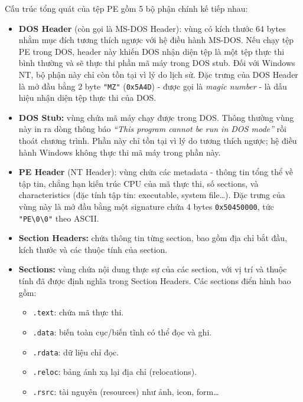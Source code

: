 Cấu trúc tổng quát của tệp PE gồm 5 bộ phận chính kế tiếp nhau:

\begin{itemize}
    \item \textbf{DOS Header} (còn gọi là MS-DOS Header): vùng có kích
        thước 64 bytes nhằm mục đích tương thích ngược với hệ điều hành
        MS-DOS. Nếu chạy tệp PE trong DOS, header này khiến DOS nhận
        diện tệp là một tệp thực thi bình thường và sẽ thực thi phần mã
        máy trong DOS stub. Đối với Windows NT, bộ phận này chỉ còn tồn
        tại vì lý do lịch sử. Đặc trưng của DOS Header là mở đầu bằng
        2 byte \texttt{"MZ"} (\texttt{0x5A4D}) - được gọi là
        \textit{magic number} - là dấu hiệu nhận diện tệp thực thi
        của DOS.

    \item \textbf{DOS Stub:} vùng chứa mã máy chạy được trong DOS.
        Thông thường vùng này in ra dòng thông báo \textit{``This
        program cannot be run in DOS mode''} rồi thoát chương trình.
        Phần này chỉ tồn tại vì lý do tương thích ngược; hệ điều hành
        Windows không thực thi mã máy trong phần này.

    \item \textbf{PE Header} (NT Header): vùng chứa các metadata -
        thông tin tổng thể về tập tin, chẳng hạn kiến trúc CPU của mã
        thực thi, số sections, và characteristics (đặc tính tập tin:
        executable, system file\dots). Đặc trưng của vùng này là mở đầu
        bằng một signature chứa 4 bytes \texttt{0x50450000}, tức
        \texttt{"PE{\textbackslash}0{\textbackslash}0"} theo ASCII.

    \item \textbf{Section Headers:} chứa thông tin từng section, bao
        gồm địa chỉ bắt đầu, kích thước và các thuộc tính của section.

    \item \textbf{Sections:} vùng chứa nội dung thực sự của các
        section, với vị trí và thuộc tính đã được định nghĩa trong
        Section Headers. Các sections điển hình bao gồm:
        \begin{itemize}
            \item \texttt{.text}: chứa mã thực thi.
            \item \texttt{.data}: biến toàn cục/biến tĩnh có thể đọc
                và ghi.
            \item \texttt{.rdata}: dữ liệu chỉ đọc.
            \item \texttt{.reloc}: bảng ánh xạ lại địa chỉ
                (relocations).
            \item \texttt{.rsrc}: tài nguyên (resources) như ảnh,
                icon, form\dots
        \end{itemize}
\end{itemize}

